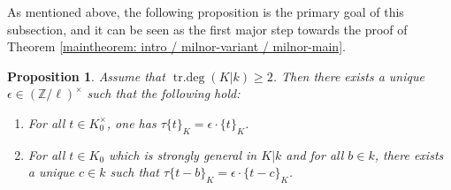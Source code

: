 \documentclass[11pt]{amsart}
\newtheorem{proposition}{Proposition}[section]
\theoremstyle{definition}
\theoremstyle{remark}
\numberwithin{equation}{section}
\DeclareMathOperator{\trdeg}{tr.deg}
\newcommand{\Z}{\mathbb{Z}}
\begin{document}
As mentioned above, the following proposition is the primary goal of this subsection, and it can be seen as the first major step towards the proof of Theorem \ref{maintheorem: intro / milnor-variant / milnor-main}.

\begin{proposition}
\label{proposition: mainproof / K0 / fix-K0}
  Assume that $\trdeg(K|k) \geq 2$.
  Then there exists a unique $\epsilon \in (\Z/\ell)^\times$ such that the following hold:
  \begin{enumerate}
    \item For all $t \in K_0^\times$, one has $\tau\{t\}_K = \epsilon \cdot \{t\}_K$.
    \item For all $t \in K_0$ which is strongly general in $K|k$ and for all $b \in k$, there exists a unique $c \in k$ such that $\tau\{t-b\}_K = \epsilon \cdot \{t-c\}_K$.
  \end{enumerate}
\end{proposition}
\end{document}

